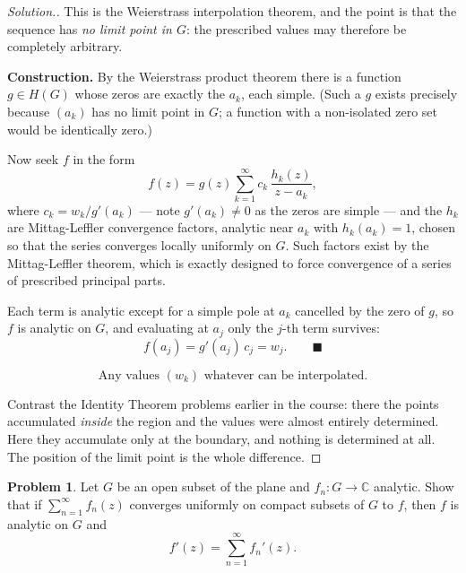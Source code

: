 \documentclass[11pt,a4paper]{article}
\theoremstyle{definition}
\newtheorem{problemx}{Problem}[section]
\newenvironment{problem}{\begin{problemx}}{\end{problemx}}
\newenvironment{solution}
  {\renewcommand{\qedsymbol}{}\begin{proof}[\textit{Solution}.]}
  {\end{proof}}
\begin{document}
\begin{solution}
This is the Weierstrass interpolation theorem, and the point is that the sequence
has \emph{no limit point in $G$}: the prescribed values may therefore be completely
arbitrary.

\textbf{Construction.} By the Weierstrass product theorem there is a function
$g \in H(G)$ whose zeros are exactly the $a_k$, each simple. (Such a $g$ exists
precisely because $(a_k)$ has no limit point in $G$; a function with a
non-isolated zero set would be identically zero.)

Now seek $f$ in the form
$$f(z) = g(z)\sum^{\infty}_{k=1} c_k\,\frac{h_k(z)}{z - a_k},$$
where $c_k = w_k / g'(a_k)$ --- note $g'(a_k) \neq 0$ as the zeros are simple --- and
the $h_k$ are Mittag-Leffler convergence factors, analytic near $a_k$ with
$h_k(a_k) = 1$, chosen so that the series converges locally uniformly on $G$. Such
factors exist by the Mittag-Leffler theorem, which is exactly designed to force
convergence of a series of prescribed principal parts.

Each term is analytic except for a simple pole at $a_k$ cancelled by the zero of
$g$, so $f$ is analytic on $G$, and evaluating at $a_j$ only the $j$-th term
survives:
$$f(a_j) = g'(a_j)\,c_j = w_j . \qquad \blacksquare$$

$$\boxed{\text{Any values } (w_k) \text{ whatever can be interpolated.}}$$

Contrast the Identity Theorem problems earlier in the course: there the points
accumulated \emph{inside} the region and the values were almost entirely
determined. Here they accumulate only at the boundary, and nothing is determined at
all. The position of the limit point is the whole difference.
\end{solution}


\begin{problem}
Let $G$ be an open subset of the plane and $f_n : G \rightarrow \mathbb{C}$
analytic. Show that if
$\displaystyle\sum^{\infty}_{n = 1} f_n(z)$ converges uniformly on compact
subsets of $G$ to $f$, then $f$ is analytic on $G$ and
$$f'(z) = \sum^{\infty}_{n = 1} f_n'(z).$$
\end{problem}
\end{document}
